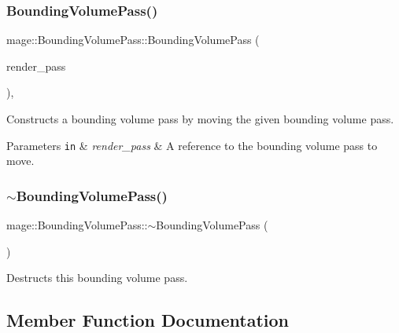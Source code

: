 \subsubsection{\texorpdfstring{Bounding\+Volume\+Pass()}{BoundingVolumePass()}\hspace{0.1cm}{\footnotesize\ttfamily [3/3]}}
{\footnotesize\ttfamily mage\+::\+Bounding\+Volume\+Pass\+::\+Bounding\+Volume\+Pass (\begin{DoxyParamCaption}\item[{\hyperlink{classmage_1_1_bounding_volume_pass}{Bounding\+Volume\+Pass} \&\&}]{render\+\_\+pass }\end{DoxyParamCaption})\hspace{0.3cm}{\ttfamily [default]}, {\ttfamily [noexcept]}}

Constructs a bounding volume pass by moving the given bounding volume pass.


\begin{DoxyParams}[1]{Parameters}
\mbox{\tt in}  & {\em render\+\_\+pass} & A reference to the bounding volume pass to move. \\
\hline
\end{DoxyParams}
\hypertarget{classmage_1_1_bounding_volume_pass_a41dc433aed26f05e8b60462a6e337509}{}\label{classmage_1_1_bounding_volume_pass_a41dc433aed26f05e8b60462a6e337509} 
\subsubsection{\texorpdfstring{$\sim$\+Bounding\+Volume\+Pass()}{~BoundingVolumePass()}}
{\footnotesize\ttfamily mage\+::\+Bounding\+Volume\+Pass\+::$\sim$\+Bounding\+Volume\+Pass (\begin{DoxyParamCaption}{ }\end{DoxyParamCaption})\hspace{0.3cm}{\ttfamily [default]}}

Destructs this bounding volume pass. 

\subsection{Member Function Documentation}
\hypertarget{classmage_1_1_bounding_volume_pass_a29a98f857f8ae45a0230b96f78f2dcb9}{}\label{classmage_1_1_bounding_volume_pass_a29a98f857f8ae45a0230b96f78f2dcb9} 
